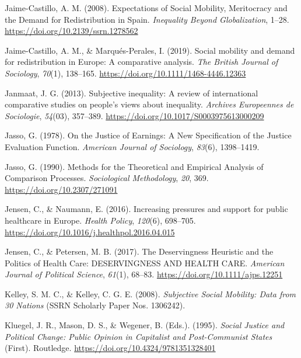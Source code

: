 \documentclass[
  12pt,
]{book}
\newlength{\cslhangindent}
\newenvironment{cslreferences}%
  {\setlength{\parindent}{0pt}%
  \everypar{\setlength{\hangindent}{\cslhangindent}}\ignorespaces}%
  {\par}
\begin{document}
\begin{cslreferences}
\leavevmode\hypertarget{ref-Jaime-Castillo2008}{}%
Jaime-Castillo, A. M. (2008). Expectations of Social Mobility, Meritocracy and the Demand for Redistribution in Spain. \emph{Inequality Beyond Globalization}, 1--28. \url{https://doi.org/10.2139/ssrn.1278562}

\leavevmode\hypertarget{ref-jaime-castillo_social_2019}{}%
Jaime-Castillo, A. M., \& Marqués-Perales, I. (2019). Social mobility and demand for redistribution in Europe: A comparative analysis. \emph{The British Journal of Sociology}, \emph{70}(1), 138--165. \url{https://doi.org/10.1111/1468-4446.12363}

\leavevmode\hypertarget{ref-Janmaat2013}{}%
Janmaat, J. G. (2013). Subjective inequality: A review of international comparative studies on people's views about inequality. \emph{Archives Europeennes de Sociologie}, \emph{54}(03), 357--389. \url{https://doi.org/10.1017/S0003975613000209}

\leavevmode\hypertarget{ref-jasso_justice_1978}{}%
Jasso, G. (1978). On the Justice of Earnings: A New Specification of the Justice Evaluation Function. \emph{American Journal of Sociology}, \emph{83}(6), 1398--1419.

\leavevmode\hypertarget{ref-Jasso1990}{}%
Jasso, G. (1990). Methods for the Theoretical and Empirical Analysis of Comparison Processes. \emph{Sociological Methodology}, \emph{20}, 369. \url{https://doi.org/10.2307/271091}

\leavevmode\hypertarget{ref-Jensenux5cux26Nauman2016}{}%
Jensen, C., \& Naumann, E. (2016). Increasing pressures and support for public healthcare in Europe. \emph{Health Policy}, \emph{120}(6), 698--705. \url{https://doi.org/10.1016/j.healthpol.2016.04.015}

\leavevmode\hypertarget{ref-Jensen2017}{}%
Jensen, C., \& Petersen, M. B. (2017). The Deservingness Heuristic and the Politics of Health Care: DESERVINGNESS AND HEALTH CARE. \emph{American Journal of Political Science}, \emph{61}(1), 68--83. \url{https://doi.org/10.1111/ajps.12251}

\leavevmode\hypertarget{ref-kelley_subjective_2008}{}%
Kelley, S. M. C., \& Kelley, C. G. E. (2008). \emph{Subjective Social Mobility: Data from 30 Nations} (SSRN Scholarly Paper Nos. 1306242).

\leavevmode\hypertarget{ref-KluegelSmithWegener1995}{}%
Kluegel, J. R., Mason, D. S., \& Wegener, B. (Eds.). (1995). \emph{Social Justice and Political Change: Public Opinion in Capitalist and Post-Communist States} (First). Routledge. \url{https://doi.org/10.4324/9781351328401}


\end{cslreferences}
\end{document}
